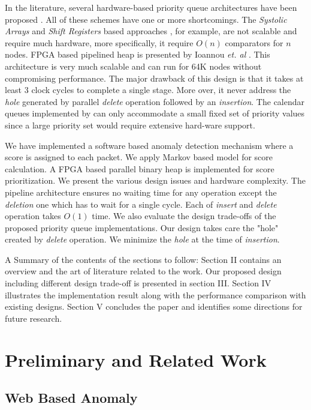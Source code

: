 \documentclass[10pt, conference, compsocconf]{IEEEtran}
\begin{document}
In the literature, several hardware-based priority queue architectures have been proposed \cite{hw8,hw9}. All of these
schemes have one or more shortcomings. The {\it Systolic Arrays} and {\it Shift Registers} based approaches \cite{hw8,hw9}, for example, are not scalable and require much hardware, more specifically, it require $O(n)$ comparators for $n$ nodes. FPGA based pipelined heap is presented by Ioannou {\it et. al} \cite{fpga1}. This architecture is very much scalable and can run for 64K nodes without compromising performance. The major drawback of this design is that it takes at least 3 clock cycles to complete a single stage. More over, it never address the {\it hole} generated by parallel {\it delete} operation followed by an {\it insertion}. The calendar queues implemented by \cite{hw1} can only accommodate a small fixed set of priority values since a large priority set would require extensive hard-ware support.

We have implemented a software based anomaly detection mechanism where a score is assigned to each packet. We apply Markov based model for score calculation. A FPGA based parallel binary heap is implemented for score prioritization. We present the various design issues and hardware complexity. The pipeline architecture ensures no waiting time for any operation except the {\it deletion} one which has to wait for a single cycle. Each of {\it insert} and {\it delete} operation takes $O(1)$ time. We also evaluate the design trade-offs of the proposed priority queue implementations. Our design takes care the "hole" created by {\it delete} operation. We minimize the {\it hole} at the time of {\it insertion}.

A Summary of the contents of the sections to follow: Section II contains an overview and the art of literature related to the work. Our proposed design including different design trade-off is presented in section III. Section IV illustrates the implementation result along with the performance comparison with existing designs. Section V concludes the paper and identifies some directions for future research.

\section{Preliminary and Related Work}
\subsection{Web Based Anomaly}
\end{document}

